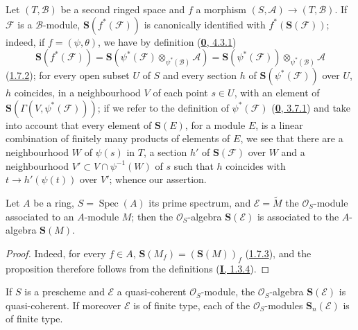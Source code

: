 \begin{env}[1.7.5]
\label{II.1.7.5}
Let $(T,\mathcal{B})$ be a second ringed space and $f$ a morphism
$(S,\mathcal{A})\to(T,\mathcal{B})$. If $\mathcal{F}$ is a
$\mathcal{B}$-module, $\mathbf{S}(f^*(\mathcal{F}))$ is canonically
identified with $f^*(\mathbf{S}(\mathcal{F}))$; indeed, if
$f=(\psi,\theta)$, we have by definition
(\hyperref[0.4.3.1]{\textbf{0}, 4.3.1})
\[
  \mathbf{S}(f^*(\mathcal{F}))
  =\mathbf{S}(\psi^*(\mathcal{F})
    \otimes_{\psi^*(\mathcal{B})}\mathcal{A})
  =\mathbf{S}(\psi^*(\mathcal{F}))
    \otimes_{\psi^*(\mathcal{B})}\mathcal{A}
\]
(\hyperref[II.1.7.2]{1.7.2}); for every open subset $U$ of $S$ and
every section $h$ of $\mathbf{S}(\psi^*(\mathcal{F}))$ over $U$, $h$
coincides, in a neighbourhood $V$ of each point $s\in U$, with an element of
$\mathbf{S}(\Gamma(V,\psi^*(\mathcal{F})))$; if we refer to the
definition of $\psi^*(\mathcal{F})$
(\hyperref[0.3.7.1]{\textbf{0}, 3.7.1}) and take into account that every element
of $\mathbf{S}(E)$, for a module $E$, is a linear combination of finitely
many products of elements of $E$, we see that there are a neighbourhood $W$
of $\psi(s)$ in $T$, a section $h'$ of $\mathbf{S}(\mathcal{F})$ over
$W$ and a neighbourhood $V'\subset V\cap\psi^{-1}(W)$ of $s$ such that $h$
coincides with $t\to h'(\psi(t))$ over $V'$; whence our
assertion.
\end{env}

\begin{proposition}[1.7.6]
\label{II.1.7.6}
Let $A$ be a ring, $S=\operatorname{Spec}(A)$ its prime spectrum, and
$\mathcal{E}=\widetilde{M}$ the $\mathcal{O}_S$-module associated to an
$A$-module $M$; then the $\mathcal{O}_S$-algebra $\mathbf{S}(\mathcal{E})$ is
associated to the $A$-algebra $\mathbf{S}(M)$.
\end{proposition}

\begin{proof}
Indeed, for every $f\in A$,
$\mathbf{S}(M_f)=(\mathbf{S}(M))_f$
(\hyperref[II.1.7.3]{1.7.3}), and the proposition therefore follows from
the definitions (\hyperref[I.1.3.4]{\textbf{I}, 1.3.4}).
\end{proof}

\begin{corollary}[1.7.7]
\label{II.1.7.7}
If $S$ is a prescheme and $\mathcal{E}$ a quasi-coherent
$\mathcal{O}_S$-module, the $\mathcal{O}_S$-algebra $\mathbf{S}(\mathcal{E})$
is quasi-coherent. If moreover $\mathcal{E}$ is of finite type, each of the
$\mathcal{O}_S$-modules $\mathbf{S}_n(\mathcal{E})$ is of finite type.
\end{corollary}


